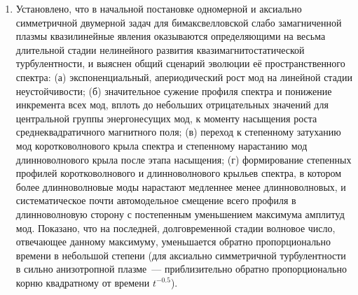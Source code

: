 \begin{enumerate}
    \item Установлено, что в начальной постановке одномерной и аксиально симметричной двумерной задач для бимаксвелловской слабо замагниченной плазмы квазилинейные явления оказываются определяющими на весьма длительной стадии нелинейного развития квазимагнитостатической турбулентности, и выяснен общий сценарий эволюции её пространственного спектра: (а) экспоненциальный, апериодический рост мод на линейной стадии неустойчивости; (б) значительное сужение профиля спектра и понижение инкремента всех мод, вплоть до небольших отрицательных значений для центральной группы энергонесущих мод, к моменту насыщения роста среднеквадратичного магнитного поля; (в) переход к степенному затуханию мод коротковолнового крыла спектра и степенному нарастанию мод длинноволнового крыла после этапа насыщения; (г) формирование степенных профилей коротковолнового и длинноволнового крыльев спектра, в котором более длинноволновые моды нарастают медленнее менее длинноволновых, и систематическое почти автомодельное смещение всего профиля в длинноволновую сторону с постепенным уменьшением максимума амплитуд мод. Показано, что на последней, долговременной стадии волновое число, отвечающее данному максимуму, уменьшается обратно пропорционально времени в небольшой степени (для аксиально симметричной турбулентности в сильно анизотропной плазме~--- приблизительно обратно пропорционально корню квадратному от времени $t^{-0.5}$). 
    

\end{enumerate}
